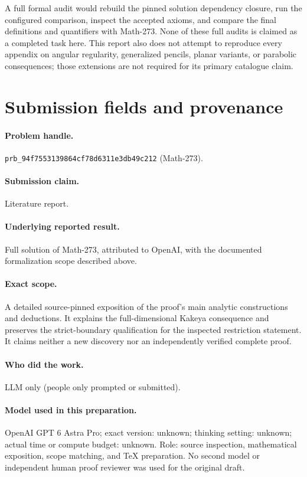 \documentclass[11pt,a4paper]{article}
\numberwithin{equation}{section}
\theoremstyle{definition}
\theoremstyle{remark}
\begin{document}
A full formal audit would rebuild the pinned solution dependency closure, run
the configured comparison, inspect the accepted axioms, and compare the final
definitions and quantifiers with Math-273. None of these full audits is claimed
as a completed task here. This report also does not attempt to reproduce every
appendix on angular regularity, generalized pencils, planar variants, or
parabolic consequences; those extensions are not required for its primary
catalogue claim.


\section{Submission fields and provenance}
\paragraph{Problem handle.} \texttt{prb\_94f7553139864cf78d6311e3db49c212}
(Math-273).
\paragraph{Submission claim.} Literature report.
\paragraph{Underlying reported result.} Full solution of Math-273, attributed to
OpenAI, with the documented formalization scope described above.
\paragraph{Exact scope.} A detailed source-pinned exposition of the proof's main
analytic constructions and deductions. It explains the full-dimensional Kakeya
consequence and preserves the strict-boundary qualification for the inspected
restriction statement. It claims neither a new discovery nor an independently
verified complete proof.
\paragraph{Who did the work.} LLM only (people only prompted or submitted).
\paragraph{Model used in this preparation.} OpenAI GPT 6 Astra Pro; exact version:
unknown; thinking setting: unknown; actual time or compute budget: unknown.
Role: source inspection, mathematical exposition, scope matching, and TeX
preparation. No second model or independent human proof reviewer was used for the original draft.
\end{document}
